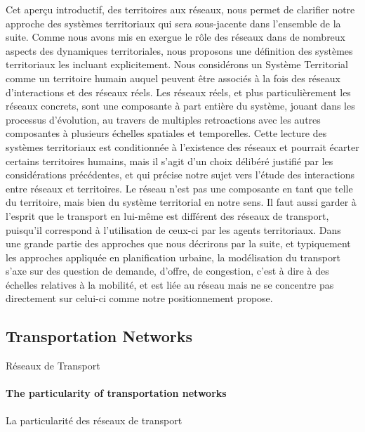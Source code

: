 {Cet aperçu introductif, des territoires aux réseaux, nous permet de clarifier notre approche des systèmes territoriaux qui sera sous-jacente dans l'ensemble de la suite. Comme nous avons mis en exergue le rôle des réseaux dans de nombreux aspects des dynamiques territoriales, nous proposons une définition des systèmes territoriaux les incluant explicitement. Nous considérons un Système Territorial comme un territoire humain auquel peuvent être associés à la fois des réseaux d'interactions et des réseaux réels. Les réseaux réels, et plus particulièrement les réseaux concrets, sont une composante à part entière du système, jouant dans les processus d'évolution, au travers de multiples retroactions avec les autres composantes à plusieurs échelles spatiales et temporelles. Cette lecture des systèmes territoriaux est conditionnée à l'existence des réseaux et pourrait écarter certains territoires humains, mais il s'agit d'un choix délibéré justifié par les considérations précédentes, et qui précise notre sujet vers l'étude des interactions entre réseaux et territoires. Le réseau n'est pas une composante en tant que telle du territoire, mais bien du système territorial en notre sens. Il faut aussi garder à l'esprit que le transport en lui-même est différent des réseaux de transport, puisqu'il correspond à l'utilisation de ceux-ci par les agents territoriaux. Dans une grande partie des approches que nous décrirons par la suite, et typiquement les approches appliquée en planification urbaine, la modélisation du transport s'axe sur des question de demande, d'offre, de congestion, c'est à dire à des échelles relatives à la mobilité, et est liée au réseau mais ne se concentre pas directement sur celui-ci comme notre positionnement propose\comment[AB]{$\simeq$}.
}


\subsection{Transportation Networks}{Réseaux de Transport}


\paragraph{The particularity of transportation networks}{La particularité des réseaux de transport}




